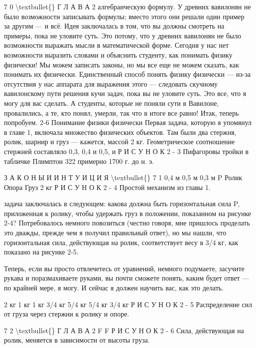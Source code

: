 \documentclass[10pt,oneside]{article}
\begin{document}
7 0 \textbackslash{}textbullet\{\} Г Л А В А  2 алгебраическую формулу. У древних вавилонян не было возможности записывать формулы; вместо этого они решали один пример за другим --- и всё. Идея заключалась в том, что вы должны смотреть на примеры, пока не уловите суть. Это потому, что у древних вавилонян не было возможности выражать мысли в математической форме. Сегодня у нас нет возможности выразить словами и объяснить студенту, как понимать физику физически! Мы можем записать законы, но мы все еще не можем сказать, как понимать их физически. Единственный способ понять физику физически --- из-за отсутствия у нас аппарата для выражения этого --- следовать скучному вавилонскому пути решения кучи задач, пока вы не уловите суть. Это все, что я могу для вас сделать. А студенты, которые не поняли сути в Вавилоне, провалились, а те, кто понял, умерли, так что в итоге все равно! Итак, теперь попробуем. 2-6 Понимание физики физически Первая задача, которую я упомянул в главе 1, включала множество физических объектов. Там были два стержня, ролик, шарнир и груз --- кажется, массой 2 кг. Геометрическое соотношение стержней составляло 0,3, 0,4 и 0,5, и Р И С У Н О К  2 - 3 Пифагоровы тройки в табличке Плимптон 322 примерно 1700 г. до н. э.\par

З А К О Н Ы  И  И Н Т У И Ц И Я \textbackslash{}textbullet\{\} 7 1 0,4 м 0,5 м 0,3 м P Ролик Опора Груз 2 кг Р И С У Н О К  2 - 4 Простой механизм из главы 1.\par

задача заключалась в следующем: какова должна быть горизонтальная сила P, приложенная к ролику, чтобы удержать груз в положении, показанном на рисунке 2-4? Потребовалось немного повозиться (честно говоря, мне пришлось проделать это дважды, прежде чем я получил правильный ответ), но мы нашли, что горизонтальная сила, действующая на ролик, соответствует весу в 3/4 кг, как показано на рисунке 2-5.\par

Теперь, если вы просто отвлечетесь от уравнений, немного подумаете, засучите рукава и поразмахиваете руками, вы почти сможете понять, каким будет ответ --- по крайней мере, я могу. И сейчас я должен научить вас, как это делать.\par

2 кг 1 кг 1 кг 3/4 кг 5/4 кг 5/4 кг 3/4 кг Р И С У Н О К  2 - 5 Распределение сил от груза через стержни к ролику и опоре.\par

7 2 \textbackslash{}textbullet\{\} Г Л А В А  2 F F Р И С У Н О К  2 - 6 Сила, действующая на ролик, меняется в зависимости от высоты груза.\par
\end{document}
